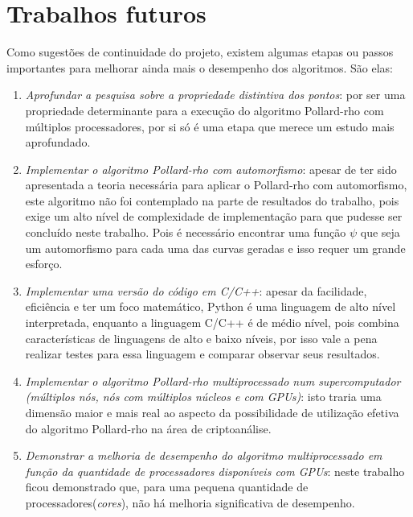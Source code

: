 \section{Trabalhos futuros}
Como sugestões de continuidade do projeto, existem algumas etapas ou passos importantes para melhorar ainda mais o desempenho dos algoritmos. São elas:

\begin{enumerate}
	\item \textit{Aprofundar a pesquisa sobre a propriedade distintiva dos pontos}: por ser uma propriedade determinante para a execução do algoritmo Pollard-rho com múltiplos processadores, por si só é uma etapa que merece um estudo mais aprofundado.
	\item \textit{Implementar o algoritmo Pollard-rho com automorfismo}: apesar de ter sido apresentada a teoria necessária para aplicar o Pollard-rho com automorfismo, este algoritmo não foi contemplado na parte de resultados do trabalho, pois exige um alto nível de complexidade de implementação para que pudesse ser concluído neste trabalho. Pois é necessário encontrar uma função \(\psi\) que seja um automorfismo para cada uma das curvas geradas e isso requer um grande esforço.
	\item \textit{Implementar uma versão do código em C/C++}: apesar da facilidade, eficiência e ter um foco matemático, Python é uma linguagem de alto nível interpretada, enquanto a linguagem C/C++ é de médio nível, pois combina características de linguagens de alto e baixo níveis, por isso vale a pena realizar testes para essa linguagem e comparar observar seus resultados.
	\item \textit{Implementar o algoritmo Pollard-rho multiprocessado num supercomputador (múltiplos nós, nós com múltiplos núcleos e com GPUs)}: isto traria uma  dimensão maior e mais real ao aspecto da possibilidade de utilização efetiva do algoritmo Pollard-rho na área de criptoanálise.
	\item \textit{Demonstrar a melhoria de desempenho do algoritmo multiprocessado em função da quantidade de processadores disponíveis com GPUs}: neste trabalho ficou demonstrado que, para uma pequena quantidade de processadores(\textit{cores}), não há melhoria significativa de desempenho.
\end{enumerate}
